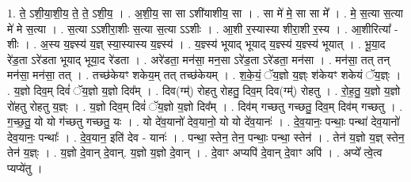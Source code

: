 \documentclass[17pt]{extarticle}
\begin{document}
1. ते॒ ऽशी॒या॒शी॒य॒ ते॒ ते॒ ऽशी॒य॒ । . अ॒शी॒य॒ सा सा ऽशी॑याशीय॒ सा । . सा मे॑ मे॒ सा सा मे᳚ । . मे॒ स॒त्या स॒त्या मे॑ मे स॒त्या । . स॒त्या ऽऽशीरा॒शीः स॒त्या स॒त्या ऽऽशीः । . आ॒शी र॒स्यास्या शीरा॒शी र॒स्य । . आ॒शीरित्या᳚ - शीः । . अ॒स्य य॒ज्ञ्स्य॑ य॒ज्ञ् स्या॒स्यास्य य॒ज्ञ्स्य॑ । . य॒ज्ञ्स्य॑ भूयाद् भूयाद् य॒ज्ञ्स्य॑ य॒ज्ञ्स्य॑ भूयात् । . भू॒या॒द रे॑ड॒ता ऽरे॑डता भूयाद् भूया॒द रे॑डता । . अरे॑डता॒ मन॑सा॒ मन॒सा ऽरे॑ड॒ता ऽरे॑डता॒ मन॑सा । . मन॑सा॒ तत् तन् मन॑सा॒ मन॑सा॒ तत् । . तच्छ॑केयꣳ शकेय॒म् तत् तच्छ॑केयम् । . श॒के॒यं॒ ॅय॒ज्ञो य॒ज्ञ्ः श॑केयꣳ शकेयं ॅय॒ज्ञ्ः । . य॒ज्ञो दिव॒म् दिवं॑ ॅय॒ज्ञो य॒ज्ञो दिव᳚म् । . दिव(ग्म्॑) रोहतु रोहतु॒ दिव॒म् दिव(ग्म्॑) रोहतु । . रो॒ह॒तु॒ य॒ज्ञो य॒ज्ञो रो॑हतु रोहतु य॒ज्ञ्ः । . य॒ज्ञो दिव॒म् दिवं॑ ॅय॒ज्ञो य॒ज्ञो दिव᳚म् । . दिव॑म् गच्छतु गच्छतु॒ दिव॒म् दिव॑म् गच्छतु । . ग॒च्छ॒तु॒ यो यो ग॑च्छतु गच्छतु॒ यः । . यो दे॑व॒यानो॑ देव॒यानो॒ यो यो दे॑व॒यानः॑ । . दे॒व॒यानः॒ पन्थाः॒ पन्था॑ देव॒यानो॑ देव॒यानः॒ पन्थाः᳚ । . दे॒व॒यान॒ इति॑ देव - यानः॑ । . पन्था॒ स्तेन॒ तेन॒ पन्थाः॒ पन्था॒ स्तेन॑ । . तेन॑ य॒ज्ञो य॒ज्ञ् स्तेन॒ तेन॑ य॒ज्ञ्ः । . य॒ज्ञो दे॒वान् दे॒वान्. य॒ज्ञो य॒ज्ञो दे॒वान् । . दे॒वाꣳ अप्यपि॑ दे॒वान् दे॒वाꣳ अपि॑ । . अप्ये᳚ त्वे॒त्व प्यप्ये॑तु । \newline
\end{document}
